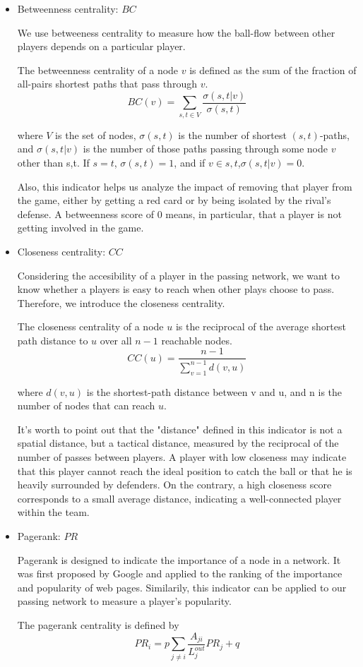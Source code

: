 \documentclass{mcmthesis}
\begin{document}
\begin{itemize}
  \item Betweenness centrality: $BC$
  
  We use betweeness centrality to measure how the ball-flow between other players depends on a particular player.
  
  The betweenness centrality of a node $v$ is defined as the sum of the fraction of all-pairs shortest paths that pass through $v$.
  \begin{equation}
    BC(v) =\sum_{s,t \in V} \frac{\sigma(s, t|v)}{\sigma(s, t)}
  \end{equation}

  where $V$ is the set of nodes, $\sigma(s,t)$ is the number of shortest $(s,t)$-paths, and $\sigma(s,t|v)$ is the number of those paths passing through some node $v$ other than s,t. If $s=t$, $\sigma(s,t)=1$, and if $v\in s,t$,$\sigma(s,t|v)=0$.
  
  Also, this indicator helps us analyze the impact of removing that player from the game, either by getting a red card or by being isolated by the rival's defense. A betweenness score of 0 means, in particular, that a player is not getting involved in the game.
  \item Closeness centrality: $CC$
  
  Considering the accesibility of a player in the passing network, we want to know whether a players is easy to reach when other plays choose to pass. Therefore, we introduce the closeness centrality.
  
  The closeness centrality of a node $u$ is the reciprocal of the average shortest path distance to $u$ over all $n-1$ reachable nodes.
  \begin{equation}
    CC(u)=\frac{n−1}{\sum^{n−1}_{v=1}d(v,u)}
  \end{equation}

  where $d(v, u)$ is the shortest-path distance between v and u, and n is the number of nodes that can reach $u$. 

  It's worth to point out that the "distance" defined in this indicator is not a spatial distance, but a tactical distance, measured by the reciprocal of the number of passes between players. A player with low closeness may indicate that this player cannot reach the ideal position to catch the ball or that he is heavily surrounded by defenders. On the contrary, a high closeness score corresponds to a small average distance, indicating a well-connected player within the team.\cite{2}

  \item Pagerank: $PR$
  
  Pagerank is designed to indicate the importance of a node in a network. It was first proposed by Google and applied to the ranking of the importance and popularity of web pages. Similarily, this indicator can be applied to our passing network to measure a player's popularity.\cite{3}

  The pagerank centrality is defined by
  \begin{equation}
    PR_i = p\sum_{j\not=i}\frac{A_{ji}}{L^{out}_j}PR_j + q
  \end{equation}
\end{itemize}
\end{document}
